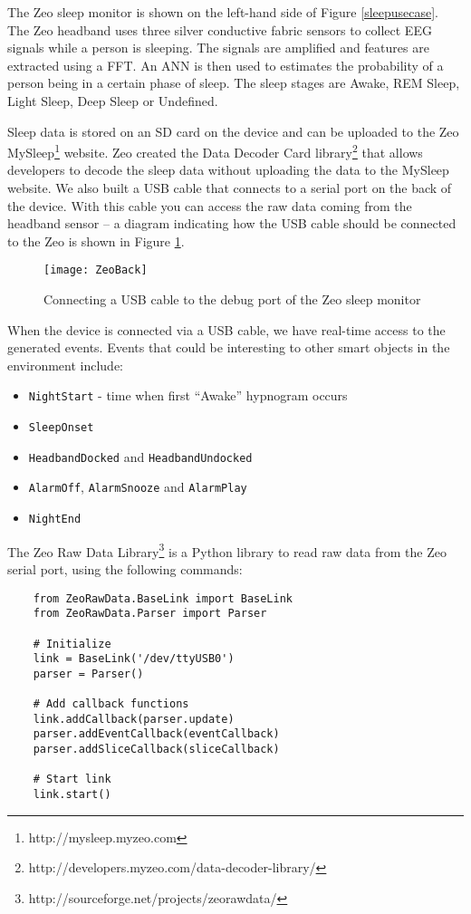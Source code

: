The Zeo sleep monitor is shown on the left-hand side of Figure \ref{sleepusecase}. The Zeo headband uses three silver conductive fabric sensors to collect \ac{EEG} signals while a person is sleeping. The signals are amplified and features are extracted using a \ac{FFT}. An \ac{ANN} is then used to estimates the probability of a person being in a certain phase of sleep\cite{Rubin2009}. The sleep stages are Awake, \ac{REM} Sleep, Light Sleep, Deep Sleep or Undefined. 

Sleep data is stored on an SD card on the device and can be uploaded to the Zeo MySleep\footnote{http://mysleep.myzeo.com} website. Zeo created the Data Decoder Card library\footnote{http://developers.myzeo.com/data-decoder-library/} that allows developers to decode the sleep data without uploading the data to the MySleep website. We also built a USB cable that connects to a serial port on the back of the device. With this cable you can access the raw data coming from the headband sensor -- a diagram indicating how the USB cable should be connected to the Zeo is shown in Figure \ref{zeoBack}.

\begin{figure}
\centering
\texttt{[image: ZeoBack]}
\caption{Connecting a USB cable to the debug port of the Zeo sleep monitor}
\label{zeoBack}
\end{figure}

When the device is connected via a USB cable, we have real-time access to the generated events. Events that could be interesting to other smart objects in the environment include:

\begin{itemize}
	\item \texttt{NightStart} - time when first ``Awake'' hypnogram occurs
	\item \texttt{SleepOnset}
	\item \texttt{HeadbandDocked} and \texttt{HeadbandUndocked}
	\item \texttt{AlarmOff}, \texttt{AlarmSnooze} and \texttt{AlarmPlay}
	\item \texttt{NightEnd}
\end{itemize}

The Zeo Raw Data Library\footnote{http://sourceforge.net/projects/zeorawdata/} is a Python library to read raw data from the Zeo serial port, using the following commands:

\begin{verbatim}
	from ZeoRawData.BaseLink import BaseLink
	from ZeoRawData.Parser import Parser

	# Initialize
	link = BaseLink('/dev/ttyUSB0')
	parser = Parser()

	# Add callback functions
	link.addCallback(parser.update)
	parser.addEventCallback(eventCallback)
	parser.addSliceCallback(sliceCallback)

	# Start link
	link.start()
\end{verbatim}

